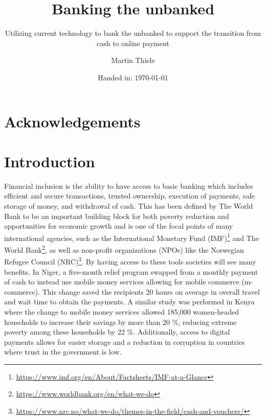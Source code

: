 \documentclass[11pt, a4paper]{article}
\author{Martin Thiele}
\title{Banking the unbanked}
\subtitle{Utilizing current technology to bank the unbanked to support the transition from cash to online payment}
\date{Handed in: \today}
\begin{document}
\renewcommand{\bibname}{References}


\maketitle

\begin{abstract}
\lipsum[1]
\end{abstract}

\clearpage

\section*{Acknowledgements}
\lipsum[2]

\clearpage

\tableofcontents
\clearpage


\section{Introduction}

Financial inclusion is the ability to have access to basic banking which includes efficient and secure transactions, trusted ownership, execution of payments, safe storage of money, and withdrawal of cash. This has been defined by The World Bank to be an important building block for both poverty reduction and opportunities for economic growth\cite{gfindex} and is one of the focal points of many international agencies, such as the International Monetary Fund (IMF)\footnote{\url{https://www.imf.org/en/About/Factsheets/IMF-at-a-Glance}} and The World Bank\footnote{\url{https://www.worldbank.org/en/what-we-do}}, as well as non-profit organizations (NPOs) like the Norwegian Refugee Council (NRC)\footnote{\url{https://www.nrc.no/what-we-do/themes-in-the-field/cash-and-vouchers/}}. By having access to these tools societies will see many benefits. In Niger, a five-month relief program swapped from a monthly payment of cash to instead use mobile money services allowing for mobile commerce (m-commerce). This change saved the recipients 20 hours on average in overall travel and wait time to obtain the payments\cite{gfindex}. A similar study was performed in Kenya where the change to mobile money services allowed 185,000 women-headed households to increase their savings by more than 20 \%, reducing extreme poverty among these households by 22 \%. Additionally, access to digital payments allows for easier storage and a reduction in corruption in countries where trust in the government is low\cite{gfindex}.
\end{document}
